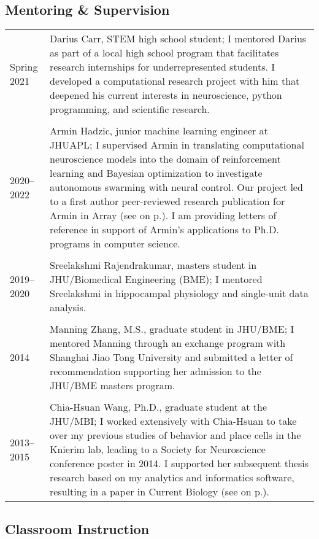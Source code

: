 \documentclass[10pt]{article}
\newcommand{\nameonpdot}[1]{\textcolor{hopkinsblue}{\emph{\nameref{sec:#1}} on p.\pageref{sec:#1}}}
\begin{document}
\subsection*{Mentoring \& Supervision}

\begin{tabular}{@{\hspace{0.2in}}l>{\raggedright\arraybackslash}p{}}
  Spring 2021 \hspace{0.05in} & Darius Carr, STEM high school student; I mentored
  Darius as part of a local high school program that facilitates research
  internships for underrepresented students. I developed a computational
  research project with him that deepened his current interests in neuroscience,
  python programming, and scientific research. \\
  \tabularnewline
  2020--2022 \hspace{0.1in} & Armin Hadzic, junior machine learning engineer
  at JHUAPL; I supervised Armin in translating computational neuroscience
  models into the domain of reinforcement learning and Bayesian optimization
  to investigate autonomous swarming with neural control. Our project led to
  a first author peer-reviewed research publication for Armin in Array (see
  \nameonpdot{hadzicpub}). I am providing letters of reference in support of
  Armin's applications to Ph.D. programs in computer science. \\
  \tabularnewline
  2019--2020 & Sreelakshmi Rajendrakumar, masters student in
  JHU/Biomedical Engineering (BME); I mentored Sreelakshmi in hippocampal
  physiology and single-unit data analysis. \\
  \tabularnewline
  2014 & Manning Zhang, M.S., graduate student in JHU/BME; I mentored Manning
  through an exchange program with Shanghai Jiao Tong University and submitted
  a letter of recommendation supporting her admission to the JHU/BME masters
  program. \\
  \tabularnewline
  2013--2015 & Chia-Hsuan Wang, Ph.D., graduate student at the JHU/MBI; I worked
  extensively with Chia-Hsuan to take over my previous studies of behavior
  and place cells in the Knierim lab, leading to a Society for Neuroscience
  conference poster in 2014. I supported her subsequent thesis research based on
  my analytics and informatics software, resulting in a paper in Current Biology
  (see \nameonpdot{wangpub}). \\
\end{tabular}

\subsection*{Classroom Instruction}
\end{document}
